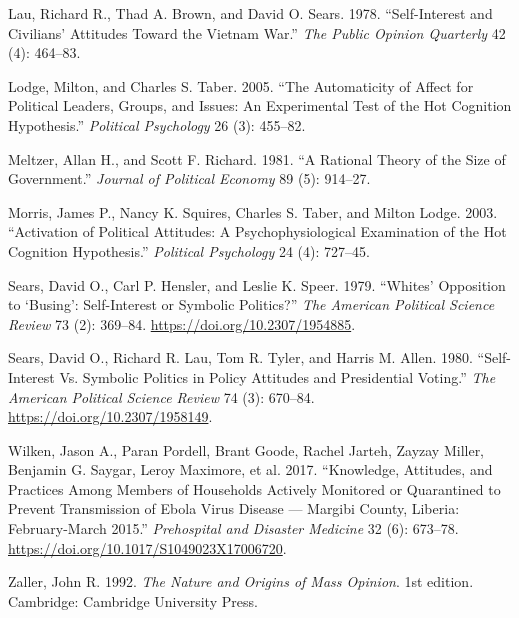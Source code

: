 \documentclass[]{article}
\begin{document}
\hypertarget{ref-lau_self-interest_1978}{}
Lau, Richard R., Thad A. Brown, and David O. Sears. 1978.
``Self-Interest and Civilians' Attitudes Toward the Vietnam War.''
\emph{The Public Opinion Quarterly} 42 (4): 464--83.

\hypertarget{ref-lodge_automaticity_2005}{}
Lodge, Milton, and Charles S. Taber. 2005. ``The Automaticity of Affect
for Political Leaders, Groups, and Issues: An Experimental Test of the
Hot Cognition Hypothesis.'' \emph{Political Psychology} 26 (3): 455--82.

\hypertarget{ref-meltzer_rational_1981}{}
Meltzer, Allan H., and Scott F. Richard. 1981. ``A Rational Theory of
the Size of Government.'' \emph{Journal of Political Economy} 89 (5):
914--27.

\hypertarget{ref-morris_activation_2003}{}
Morris, James P., Nancy K. Squires, Charles S. Taber, and Milton Lodge.
2003. ``Activation of Political Attitudes: A Psychophysiological
Examination of the Hot Cognition Hypothesis.'' \emph{Political
Psychology} 24 (4): 727--45.

\hypertarget{ref-sears_whites_1979}{}
Sears, David O., Carl P. Hensler, and Leslie K. Speer. 1979. ``Whites'
Opposition to `Busing': Self-Interest or Symbolic Politics?'' \emph{The
American Political Science Review} 73 (2): 369--84.
\url{https://doi.org/10.2307/1954885}.

\hypertarget{ref-sears_self-interest_1980}{}
Sears, David O., Richard R. Lau, Tom R. Tyler, and Harris M. Allen.
1980. ``Self-Interest Vs. Symbolic Politics in Policy Attitudes and
Presidential Voting.'' \emph{The American Political Science Review} 74
(3): 670--84. \url{https://doi.org/10.2307/1958149}.

\hypertarget{ref-wilken_knowledge_2017}{}
Wilken, Jason A., Paran Pordell, Brant Goode, Rachel Jarteh, Zayzay
Miller, Benjamin G. Saygar, Leroy Maximore, et al. 2017. ``Knowledge,
Attitudes, and Practices Among Members of Households Actively Monitored
or Quarantined to Prevent Transmission of Ebola Virus Disease ---
Margibi County, Liberia: February-March 2015.'' \emph{Prehospital and
Disaster Medicine} 32 (6): 673--78.
\url{https://doi.org/10.1017/S1049023X17006720}.

\hypertarget{ref-zaller_nature_1992}{}
Zaller, John R. 1992. \emph{The Nature and Origins of Mass Opinion}. 1st
edition. Cambridge: Cambridge University Press.
\end{document}
